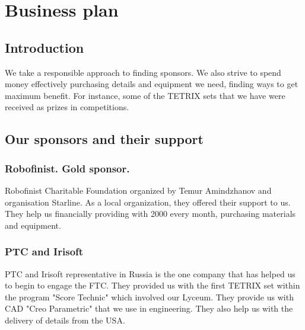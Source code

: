 \section{Business plan}
	\subsection{Introduction}
	We take a responsible approach to finding sponsors. We also strive to spend money effectively purchasing details and equipment we need, finding ways to get maximum benefit. For instance, some of the TETRIX sets that we have were received as prizes in competitions.
	
	\subsection{Our sponsors and their support}
		\subsubsection{Robofinist. Gold sponsor.}	
		Robofinist Charitable Foundation organized by Temur Amindzhanov and organisation Starline. As a local organization, they offered their support to us. They help us financially providing with 2000 \textdollar every month, purchasing materials and equipment.
		
		\subsubsection{PTC and Irisoft}
		PTC and Irisoft representative in Russia is the one company that has helped us to begin to engage the FTC. They provided us with the first TETRIX set within the program "Score Technic" which involved our Lyceum. They provide us with CAD "Creo Parametric" that we use in engineering. They also help us with the delivery of details from the USA.
		
		
